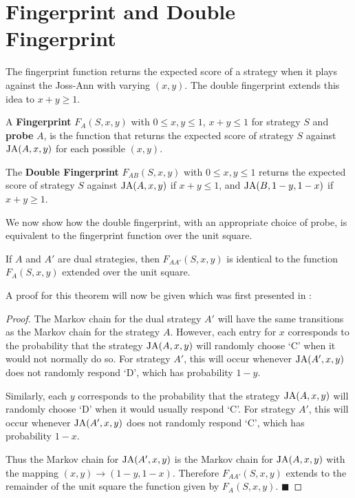 \section{Fingerprint and Double Fingerprint}
The fingerprint function returns the expected score of a strategy when it plays against the Joss-Ann with varying $(x, y)$.
The double fingerprint extends this idea to $x+y \geq 1$.

\begin{definition}\label{def:fingerprint}
A \textbf{Fingerprint} $F_A(S, x, y)$ with $0 \leq x, y \leq 1$, $x+y \leq 1$ for strategy $S$ and \textbf{probe} $A$, is the function that returns the expected score of strategy $S$ against $\text{JA}(A, x, y)$ for each possible $(x, y)$.
\end{definition}


\begin{definition}\label{def:double-fingerprint}
The \textbf{Double Fingerprint} $F_{AB}(S, x, y)$ with $0 \leq x, y \leq 1$ returns the expected score of strategy $S$ against $\text{JA}(A, x, y)$ if $x+y \leq 1$, and $\text{JA}(B, 1-y, 1-x)$ if $x+y \geq 1$.
\end{definition}

We now show how the double fingerprint, with an appropriate choice of probe, is equivalent to the fingerprint function over the unit square.

\begin{theorem}\label{thm:fingerprint-unit-square}
If $A$ and $A'$ are dual strategies, then $F_{AA'}(S, x, y)$ is identical to the function $F_A(S, x, y)$ extended over the unit square.
\end{theorem}

A proof for this theorem will now be given which was first presented in \cite{Ashlock2004}:
\begin{proof}\label{prf:fingerprint-unit-square}
The Markov chain for the dual strategy $A'$ will have the same transitions as the Markov chain for the strategy $A$.
However, each entry for $x$ corresponds to the probability that the strategy $\text{JA}(A, x, y)$ will randomly choose `C' when it would not normally do so.
For strategy $A'$, this will occur whenever $\text{JA}(A', x, y)$ does not randomly respond `D', which has probability $1 - y$.

Similarly, each $y$ corresponds to the probability that the strategy $\text{JA}(A, x, y)$ will randomly choose `D' when it would usually respond `C'.
For strategy $A'$, this will occur whenever $\text{JA}(A', x, y)$ does not randomly respond `C', which has probability $1 - x$.

Thus the Markov chain for $\text{JA}(A', x, y)$ is the Markov chain for $\text{JA}(A, x, y)$ with the mapping $(x, y) \rightarrow (1-y, 1-x)$.
Therefore $F_{AA'}(S, x, y)$ extends to the remainder of the unit square the function given by $F_A(S, x, y)$. $\blacksquare$
\end{proof}

